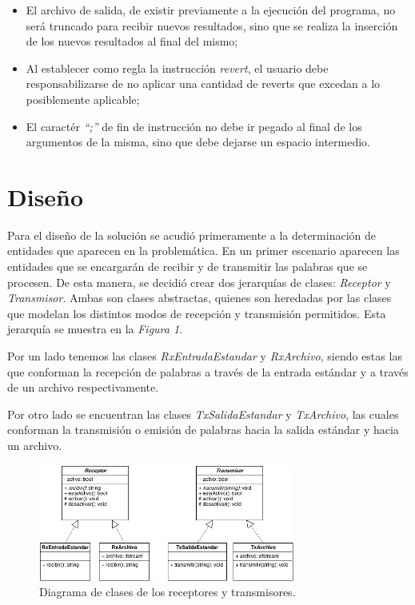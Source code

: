 \documentclass{article}
\begin{document}
\begin{itemize}
	\itemsep=3pt \topsep=0pt \partopsep=0pt \parskip=0pt \parsep=0pt
	
	\item El archivo de salida, de existir previamente a la ejecución del programa, no será truncado para recibir nuevos resultados, sino que se realiza la inserción de los nuevos resultados al final del mismo;

	\item Al establecer como regla la instrucción \textit{revert}, el usuario debe responsabilizarse de no aplicar una cantidad de reverts que excedan a lo posiblemente aplicable;

	\item El caractér \textit{``;''} de fin de instrucción no debe ir pegado al final de los argumentos de la misma, sino que debe dejarse un espacio intermedio.


\end{itemize}
\smallskip




\section{Diseño}

	Para el diseño de la solución se acudió primeramente a la determinación de entidades que aparecen en la problemática. En un primer escenario aparecen las entidades que se encargarán de recibir y de transmitir las palabras que se procesen. De esta manera, se decidió crear dos jerarquías de clases: \textit{Receptor} y \textit{Transmisor}. Ambas son clases abstractas, quienes son heredadas por las clases que modelan los distintos modos de recepción y transmisión permitidos. Esta jerarquía se muestra en la \textit{Figura 1}.
	\par
	Por un lado tenemos las clases \textit{RxEntradaEstandar} y \textit{RxArchivo}, siendo estas las que conforman la recepción de palabras a través de la entrada estándar y a través de un archivo respectivamente.
	\par
	Por otro lado se encuentran las clases \textit{TxSalidaEstandar} y \textit{TxArchivo}, las cuales conforman la transmisión o emisión de palabras hacia la salida estándar y hacia un archivo.
	

\newpage
\begin{figure}[h]
	\centering
	\includegraphics[width=0.75\textwidth]{images/diagrama_2.png}
	\medskip
	\caption{Diagrama de clases de los receptores y transmisores.}
\end{figure}
\bigskip\bigskip\bigskip
\end{document}
